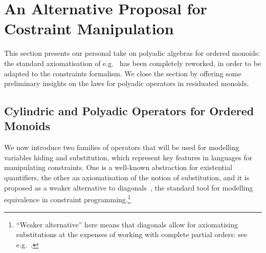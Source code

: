 \documentclass{llncs}
\newcommand{\comment}[1]{}
\def\odiv{\, {\ominus\hspace{-7.7pt} \div} \,}
\begin{document}
\comment{
\begin{example}
\label{notdistr}
Let us consider the monoid $S = \langle \{p,u,n,t\}, \otimes_s, u \rangle$ (with $t$ the top 
of three otherwise unrelated elements): 
$p$ and $n$ intuitively represent the sign of an integer, $t$ tells us that 
the sign cannot be determined, $u$ is the zero
and $\otimes_s$ (which is idempotent) tells us the sign of the addition of two integers, so that 
for all elements $x$ we have
\[x \otimes_s x = u \otimes_s x = x \mbox{  and  } t \otimes_s x = p \otimes_s n = t\]
%
We now add the bottom, in order to obtain a complete lattice.
The $\otimes_s$ is extended in the expected way,  so that $\bot$ is absorbing.
%
Intuitively, $\bot$ states that an element is unsigned:
a pattern the reader familiar with abstract interpretation formalisms will recognise.

The resulting semi-lattice monoid is residuated, with $\odiv$ defined as

$$x \odiv y = \bigg \{\begin{array}{ll}
	t & y \leq x \\
	\bot & \ otherwise
	\end{array}$$
%
Thus, $\odiv$ does not distribute, since 
$\bigvee \{p \odiv n, u \odiv n\}  = \bot < \bigvee \{p, u\} \odiv n = t \odiv n = t$.
\end{example}
}

\section{An Alternative Proposal for Costraint Manipulation}
\label{newpro}

This section presents our personal take on polyadic algebras for ordered monoids:
the standard axiomatisation of e.g.~\cite{sagi2013} has been completely 
reworked, in order to be adapted to the constraints formalism.
%
We close the section by offering some preliminary insights on 
the laws for polyadic operators in residuated monoids.

\subsection{Cylindric and Polyadic Operators for Ordered Monoids}
\label{cypo}
We now introduce two families of operators 
that will be used
for modelling variables hiding and substitution, which represent
key features in languages for manipulating constraints.
%
One is a well-known abstraction for existential quantifiers,
the other an axiomatisation of the notion of
substitution, and it is proposed as a weaker  alternative 
to diagonals~\cite{popl91}, the standard tool for modelling 
equivalence in constraint programming.\footnote{``Weaker 
alternative'' here means that diagonals allow for axiomatising
substitutions at the expenses of working with complete
partial orders: see e.g.~\cite[Definition 11]{jlamp17}.}
%
\end{document}

